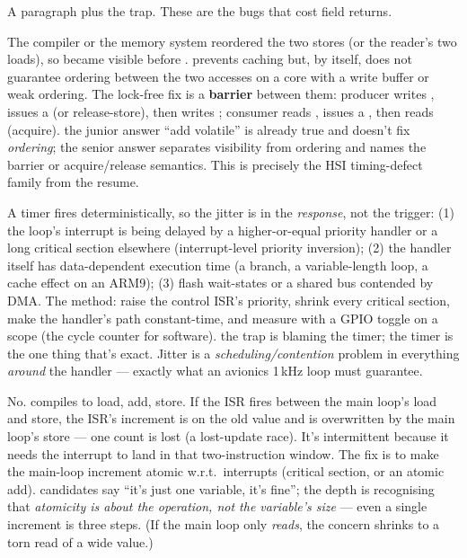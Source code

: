 %
{A paragraph plus the trap. These are the bugs that cost field returns.}

The compiler or the memory system reordered the two stores (or the reader's two
loads), so  became visible before . 
prevents caching but, by itself, does not guarantee ordering between the two
accesses on a core with a write buffer or weak ordering. The lock-free fix is a
\textbf{barrier} between them: producer writes , issues a 
(or release-store), then writes ; consumer reads ,
issues a , then reads  (acquire). \trap the junior answer
``add volatile'' is already true and doesn't fix \emph{ordering}; the senior
answer separates visibility from ordering and names the barrier or
acquire/release semantics. This is precisely the HSI timing-defect family from
the resume.

A timer fires deterministically, so the jitter is in the \emph{response}, not
the trigger: (1) the loop's interrupt is being delayed by a higher-or-equal
priority handler or a long critical section elsewhere (interrupt-level priority
inversion); (2) the handler itself has data-dependent execution time (a branch,
a variable-length loop, a cache effect on an ARM9); (3) flash wait-states or a
shared bus contended by DMA. The method: raise the control ISR's priority,
shrink every critical section, make the handler's path constant-time, and
measure with a GPIO toggle on a scope (the  cycle counter for
software). \trap the trap is blaming the timer; the timer is the one thing
that's exact. Jitter is a \emph{scheduling/contention} problem in everything
\emph{around} the handler --- exactly what an avionics 1\,kHz loop must
guarantee.

No.  compiles to load, add, store. If the ISR fires between the
main loop's load and store, the ISR's increment is on the old value and is
overwritten by the main loop's store --- one count is lost (a lost-update
race). It's intermittent because it needs the interrupt to land in that
two-instruction window. The fix is to make the main-loop increment atomic
w.r.t.\ interrupts (critical section, or an atomic add). \trap candidates say
``it's just one variable, it's fine''; the depth is recognising that
\emph{atomicity is about the operation, not the variable's size} --- even a
single  increment is three steps. (If the main loop only \emph{reads},
the concern shrinks to a torn read of a wide value.)

